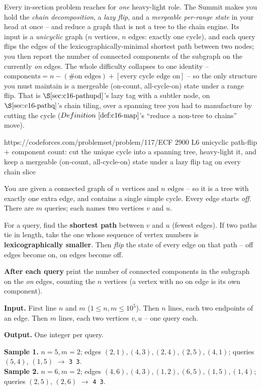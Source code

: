 
\begin{notebox}
Every in-section problem reaches for \emph{one} heavy-light role. The Summit makes you hold the
\emph{chain decomposition}, a \emph{lazy flip}, and a \emph{mergeable per-range state} in your head
at once -- and reduce a graph that is not a tree to the chain engine. Its input is a
\emph{unicyclic} graph (\(n\) vertices, \(n\) edges: exactly one cycle), and each query flips the
edges of the lexicographically-minimal shortest path between two nodes; you then report the number
of connected components of the subgraph on the currently \emph{on} edges. The whole difficulty
collapses to one identity -- \(\text{components}=n-(\#\text{on edges})+[\text{every cycle edge on}]\)
-- so the only structure you must maintain is a mergeable (on-count, all-cycle-on) state under a
range flip. That is \(\secref{c16-pathupd}\)'s lazy tag with a subtler node, on \(\secref{c16-pathq}\)'s
chain tiling, over a spanning tree you had to manufacture by cutting the cycle
(\(\defref{c16-map}\)'s ``reduce a non-tree to chains'' move).
\end{notebox}

  {https://codeforces.com/problemset/problem/117/E}{CF 2900 L6}
  {unicyclic path-flip + component count: cut the unique cycle into a spanning tree, heavy-light it, and keep a mergeable (on-count, all-cycle-on) state under a lazy flip tag on every chain slice}

\begin{problemstatement}
You are given a connected graph of \(n\) vertices and \(n\) edges -- so it is a tree with exactly
one extra edge, and contains a single simple cycle. Every edge starts \emph{off}. There are \(m\)
queries; each names two vertices \(v\) and \(u\).

For a query, find the \textbf{shortest path} between \(v\) and \(u\) (fewest edges). If two paths
tie in length, take the one whose sequence of vertex numbers is \textbf{lexicographically smaller}.
Then \emph{flip} the state of every edge on that path -- off edges become on, on edges become off.

\textbf{After each query} print the number of connected components in the subgraph on the
\emph{on} edges, counting the \(n\) vertices (a vertex with no on edge is its own component).

\textbf{Input.} First line \(n\) and \(m\) (\(1\le n,m\le 10^{5}\)). Then \(n\) lines, each two
endpoints of an edge. Then \(m\) lines, each two vertices \(v,u\) -- one query each.

\textbf{Output.} One integer per query.

\textbf{Sample 1.} \(n{=}5,m{=}2\); edges \((2,1),(4,3),(2,4),(2,5),(4,1)\); queries \((5,4)\),
\((1,5)\) \(\to\) \texttt{3 3}.\\
\textbf{Sample 2.} \(n{=}6,m{=}2\); edges \((4,6),(4,3),(1,2),(6,5),(1,5),(1,4)\); queries
\((2,5)\), \((2,6)\) \(\to\) \texttt{4 3}.
\end{problemstatement}

